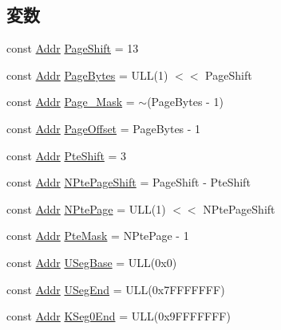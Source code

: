 \subsection*{変数}
\begin{DoxyCompactItemize}
\item 
const \hyperlink{base_2types_8hh_af1bb03d6a4ee096394a6749f0a169232}{Addr} \hyperlink{namespaceMipsISA_a6eacddc1d6d191380d9afdac5920ea48}{PageShift} = 13
\item 
const \hyperlink{base_2types_8hh_af1bb03d6a4ee096394a6749f0a169232}{Addr} \hyperlink{namespaceMipsISA_ad9d6a4d965e107c9a7214f096107296b}{PageBytes} = ULL(1) $<$$<$ PageShift
\item 
const \hyperlink{base_2types_8hh_af1bb03d6a4ee096394a6749f0a169232}{Addr} \hyperlink{namespaceMipsISA_ac2d47d845cf48dbc176f717bb7d50a7f}{Page\_\-Mask} = $\sim$(PageBytes -\/ 1)
\item 
const \hyperlink{base_2types_8hh_af1bb03d6a4ee096394a6749f0a169232}{Addr} \hyperlink{namespaceMipsISA_a51e1064f1269394dc26702651be5061f}{PageOffset} = PageBytes -\/ 1
\item 
const \hyperlink{base_2types_8hh_af1bb03d6a4ee096394a6749f0a169232}{Addr} \hyperlink{namespaceMipsISA_af2c06ba3a5eb15cdac25d21b735b7161}{PteShift} = 3
\item 
const \hyperlink{base_2types_8hh_af1bb03d6a4ee096394a6749f0a169232}{Addr} \hyperlink{namespaceMipsISA_a9f060ccda225dfb28dff712695adab46}{NPtePageShift} = PageShift -\/ PteShift
\item 
const \hyperlink{base_2types_8hh_af1bb03d6a4ee096394a6749f0a169232}{Addr} \hyperlink{namespaceMipsISA_ae295358052b4e754e08cd5cd763c212a}{NPtePage} = ULL(1) $<$$<$ NPtePageShift
\item 
const \hyperlink{base_2types_8hh_af1bb03d6a4ee096394a6749f0a169232}{Addr} \hyperlink{namespaceMipsISA_a11ac2316fa90081132b648e36e4dd11b}{PteMask} = NPtePage -\/ 1
\item 
const \hyperlink{base_2types_8hh_af1bb03d6a4ee096394a6749f0a169232}{Addr} \hyperlink{namespaceMipsISA_a9d54e751f7acdb2ea3b820539047d085}{USegBase} = ULL(0x0)
\item 
const \hyperlink{base_2types_8hh_af1bb03d6a4ee096394a6749f0a169232}{Addr} \hyperlink{namespaceMipsISA_a42b44a1d23d813c474aef63cd9c7a729}{USegEnd} = ULL(0x7FFFFFFF)
\item 
const \hyperlink{base_2types_8hh_af1bb03d6a4ee096394a6749f0a169232}{Addr} \hyperlink{namespaceMipsISA_a38ea65b3cfd9a327455141035c4393ea}{KSeg0End} = ULL(0x9FFFFFFF)
\item 

\end{DoxyCompactItemize}
